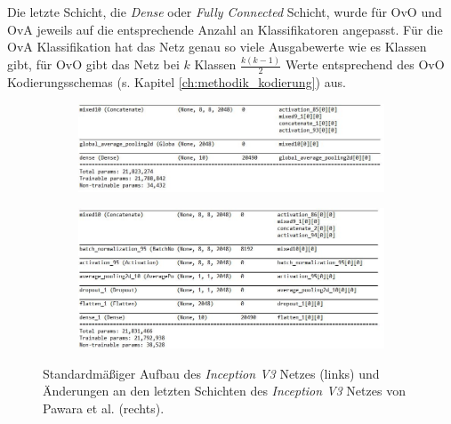 Die letzte Schicht, die \textit{Dense} oder \textit{Fully Connected} Schicht, wurde für OvO und OvA jeweils auf die entsprechende Anzahl an Klassifikatoren angepasst. Für die OvA Klassifikation hat das Netz genau so viele Ausgabewerte wie es Klassen gibt, für OvO gibt das Netz bei $k$ Klassen $\frac{k(k-1)}{2}$ Werte entsprechend des OvO Kodierungsschemas (s. Kapitel \ref{ch:methodik_kodierung}) aus.

\begin{figure}[H]

\begin{minipage}{.5\textwidth}
\begin{figure}[H]
\begin{adjustbox}{width=\textwidth, center}
\includegraphics[scale=1]{img/3_inception-standard.jpg}
\end{adjustbox}
\end{figure}
\end{minipage}%
\begin{minipage}{.5\textwidth}
\begin{figure}[H]
\begin{adjustbox}{width=\textwidth, center}
\includegraphics[scale=1]{img/3_inception-pawara.jpg}
\end{adjustbox}

\end{figure}
\end{minipage}
\caption{Standardmäßiger Aufbau des \textit{Inception V3} Netzes (links) und Änderungen an den letzten Schichten des \textit{Inception V3} Netzes von Pawara et al. \cite{pawaraWebsiteCode} (rechts).}
\label{fig:inceptionAenderungen}
\end{figure}


